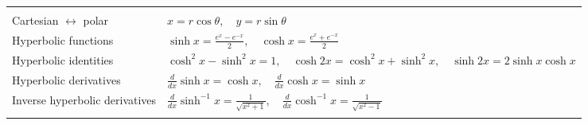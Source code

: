 \begin{landscape}
\begin{multicols*}{2}
\begin{tabularx}{\columnwidth}{@{}lX@{}}
                                                &                                                                                                                                                                                                                                                                                                                        \\
            Cartesian $\leftrightarrow$ polar   & $x=r\cos\theta,\quad y=r\sin\theta$                                                                                                                                                                                                                                                                                    \\
            Hyperbolic functions                & $\sinh x=\frac{e^x-e^{-x}}{2},\quad\cosh x=\frac{e^x+e^{-x}}{2}$                                                                                                                                                                                                                                                       \\
            Hyperbolic identities               & $\cosh^2x-\sinh^2x=1,\quad\cosh 2x=\cosh^2x+\sinh^2x,\quad\sinh 2x=2\sinh x\cosh x$                                                                                                                                                                                                                                    \\
            Hyperbolic derivatives              & $\frac{d}{dx}\sinh x=\cosh x,\quad\frac{d}{dx}\cosh x=\sinh x$                                                                                                                                                                                                                                                         \\
            Inverse hyperbolic derivatives      & $\frac{d}{dx}\sinh^{-1} x=\frac{1}{\sqrt{x^2+1}},\quad\frac{d}{dx}\cosh^{-1} x=\frac{1}{\sqrt{x^2-1}}$                                                                                                                                                                                                                 \\
                                                &                                                                                                                                                                                                                                                                                                                        \\

\end{tabularx}
\end{multicols*}
\end{landscape}
